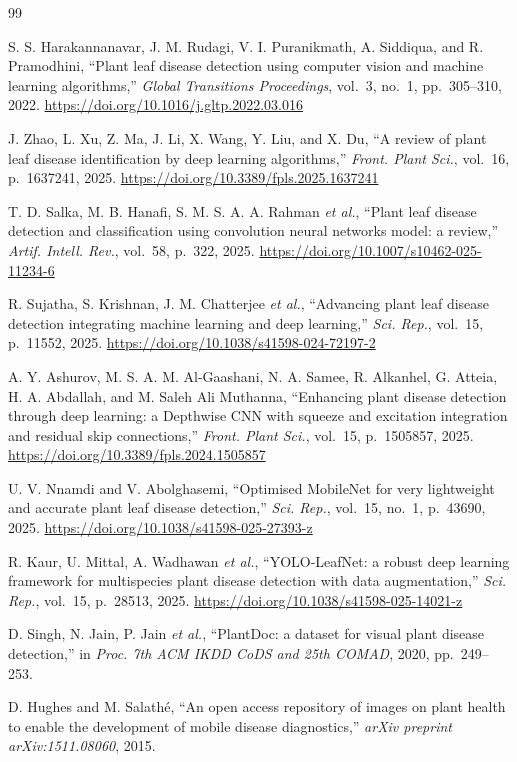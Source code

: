 \documentclass[10pt, conference]{IEEEtran}
\begin{document}
\begin{thebibliography}{99}

S. S. Harakannanavar, J. M. Rudagi, V. I. Puranikmath, A. Siddiqua, and R. Pramodhini,
``Plant leaf disease detection using computer vision and machine learning algorithms,''
\textit{Global Transitions Proceedings}, vol.~3, no.~1, pp.~305--310, 2022.
\url{https://doi.org/10.1016/j.gltp.2022.03.016}

J. Zhao, L. Xu, Z. Ma, J. Li, X. Wang, Y. Liu, and X. Du,
``A review of plant leaf disease identification by deep learning algorithms,''
\textit{Front. Plant Sci.}, vol.~16, p.~1637241, 2025.
\url{https://doi.org/10.3389/fpls.2025.1637241}

T. D. Salka, M. B. Hanafi, S. M. S. A. A. Rahman \textit{et al.},
``Plant leaf disease detection and classification using convolution neural networks
model: a review,''
\textit{Artif. Intell. Rev.}, vol.~58, p.~322, 2025.
\url{https://doi.org/10.1007/s10462-025-11234-6}

R. Sujatha, S. Krishnan, J. M. Chatterjee \textit{et al.},
``Advancing plant leaf disease detection integrating machine learning and deep
learning,''
\textit{Sci. Rep.}, vol.~15, p.~11552, 2025.
\url{https://doi.org/10.1038/s41598-024-72197-2}

A. Y. Ashurov, M. S. A. M. Al-Gaashani, N. A. Samee, R. Alkanhel, G. Atteia,
H. A. Abdallah, and M. Saleh Ali Muthanna,
``Enhancing plant disease detection through deep learning: a Depthwise CNN with
squeeze and excitation integration and residual skip connections,''
\textit{Front. Plant Sci.}, vol.~15, p.~1505857, 2025.
\url{https://doi.org/10.3389/fpls.2024.1505857}

U. V. Nnamdi and V. Abolghasemi,
``Optimised MobileNet for very lightweight and accurate plant leaf disease detection,''
\textit{Sci. Rep.}, vol.~15, no.~1, p.~43690, 2025.
\url{https://doi.org/10.1038/s41598-025-27393-z}

R. Kaur, U. Mittal, A. Wadhawan \textit{et al.},
``YOLO-LeafNet: a robust deep learning framework for multispecies plant disease
detection with data augmentation,''
\textit{Sci. Rep.}, vol.~15, p.~28513, 2025.
\url{https://doi.org/10.1038/s41598-025-14021-z}

D. Singh, N. Jain, P. Jain \textit{et al.},
``PlantDoc: a dataset for visual plant disease detection,''
in \textit{Proc. 7th ACM IKDD CoDS and 25th COMAD}, 2020, pp.~249--253.

D. Hughes and M. Salathé,
``An open access repository of images on plant health to enable the development
of mobile disease diagnostics,''
\textit{arXiv preprint arXiv:1511.08060}, 2015.

\end{thebibliography}
\end{document}
